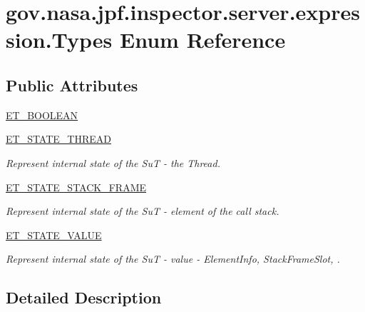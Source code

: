 \hypertarget{enumgov_1_1nasa_1_1jpf_1_1inspector_1_1server_1_1expression_1_1_types}{}\section{gov.\+nasa.\+jpf.\+inspector.\+server.\+expression.\+Types Enum Reference}
\label{enumgov_1_1nasa_1_1jpf_1_1inspector_1_1server_1_1expression_1_1_types}
\subsection*{Public Attributes}
\begin{DoxyCompactItemize}
\item 
\hyperlink{enumgov_1_1nasa_1_1jpf_1_1inspector_1_1server_1_1expression_1_1_types_a58b701f1f303b57605881d98f7bc627c}{E\+T\+\_\+\+B\+O\+O\+L\+E\+AN}
\item 
\hyperlink{enumgov_1_1nasa_1_1jpf_1_1inspector_1_1server_1_1expression_1_1_types_ae0344fef35857580078d3856bfb25e5d}{E\+T\+\_\+\+S\+T\+A\+T\+E\+\_\+\+T\+H\+R\+E\+AD}
\begin{DoxyCompactList}\small\item\em Represent internal state of the SuT -\/ the Thread. \end{DoxyCompactList}\item 
\hyperlink{enumgov_1_1nasa_1_1jpf_1_1inspector_1_1server_1_1expression_1_1_types_a9ee0f41543e84e4856cc5e017d96072a}{E\+T\+\_\+\+S\+T\+A\+T\+E\+\_\+\+S\+T\+A\+C\+K\+\_\+\+F\+R\+A\+ME}
\begin{DoxyCompactList}\small\item\em Represent internal state of the SuT -\/ element of the call stack. \end{DoxyCompactList}\item 
\hyperlink{enumgov_1_1nasa_1_1jpf_1_1inspector_1_1server_1_1expression_1_1_types_acdc859233676fcda4c87b153dfef9f76}{E\+T\+\_\+\+S\+T\+A\+T\+E\+\_\+\+V\+A\+L\+UE}
\begin{DoxyCompactList}\small\item\em Represent internal state of the SuT -\/ value -\/ Element\+Info, Stack\+Frame\+Slot, . \end{DoxyCompactList}\end{DoxyCompactItemize}


\subsection{Detailed Description}



